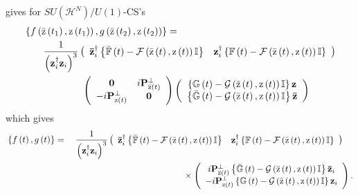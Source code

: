 \documentclass[aps,preprint]{revtex4}%
\begin{document}
gives for $SU\left(  \mathcal{H}^{N}\right)  /U\left(  1\right)  $-CS's%
\begin{align}
&  \left\{  f\left(  \mathrm{\bar{z}}\left(  t_{1}\right)  \mathrm{,z}\left(
t_{1}\right)  \right)  ,g\left(  \mathrm{\bar{z}}\left(  t_{2}\right)
\mathrm{,z}\left(  t_{2}\right)  \right)  \right\}  =\nonumber\\
&  \qquad\frac{1}{\left(  \mathbf{z}_{i}^{\dagger}\mathbf{z}_{i}\right)  ^{3}%
}\left(
\begin{array}
[c]{cc}%
\mathbf{\bar{z}}_{i}^{\dagger}\left\{  \mathbb{\bar{F}}\left(  t\right)
-\mathcal{F}\left(  \mathrm{\bar{z}}\left(  t\right)  \mathrm{,z}\left(
t\right)  \right)  \mathbb{I}\right\}   & \mathbf{z}_{i}^{\dagger}\left\{
\mathbb{F}\left(  t\right)  -\mathcal{F}\left(  \mathrm{\bar{z}}\left(
t\right)  \mathrm{,z}\left(  t\right)  \right)  \mathbb{I}\right\}
\end{array}
\right)  \nonumber\\
&  \qquad\qquad\qquad\left(
\begin{array}
[c]{cc}%
\mathbf{0} & i\mathbf{P}_{\mathrm{\bar{z}}\left(  t\right)  }^{\bot}\\
-i\mathbf{P}_{\mathrm{z}\left(  t\right)  }^{\bot} & \mathbf{0}%
\end{array}
\right)  \left(
\begin{array}
[c]{c}%
\left\{  \mathbb{G}\left(  t\right)  -\mathcal{G}\left(  \mathrm{\bar{z}%
}\left(  t\right)  \mathrm{,z}\left(  t\right)  \right)  \mathbb{I}\right\}
\mathbf{z}\\
\left\{  \mathbb{\bar{G}}\left(  t\right)  -\mathcal{G}\left(  \mathrm{\bar
{z}}\left(  t\right)  \mathrm{,z}\left(  t\right)  \right)  \mathbb{I}%
\right\}  \mathbf{\bar{z}}%
\end{array}
\right)
\end{align}
which gives
\begin{align}
& \left\{  f\left(  t\right)  ,g\left(  t\right)  \right\}  =\quad\frac
{1}{\left(  \mathbf{z}_{i}^{\dagger}\mathbf{z}_{i}\right)  ^{3}}\left(
\begin{array}
[c]{cc}%
\mathbf{\bar{z}}_{i}^{\dagger}\left\{  \mathbb{\bar{F}}\left(  t\right)
-\mathcal{F}\left(  \mathrm{\bar{z}}\left(  t\right)  \mathrm{,z}\left(
t\right)  \right)  \mathbb{I}\right\}   & \mathbf{z}_{i}^{\dagger}\left\{
\mathbb{F}\left(  t\right)  -\mathcal{F}\left(  \mathrm{\bar{z}}\left(
t\right)  \mathrm{,z}\left(  t\right)  \right)  \mathbb{I}\right\}
\end{array}
\right)  \nonumber\\
& \qquad\qquad\qquad\qquad\qquad\qquad\qquad\qquad\qquad\qquad\times\left(
\begin{array}
[c]{c}%
i\mathbf{P}_{\mathrm{\bar{z}}\left(  t\right)  }^{\bot}\left\{  \mathbb{\bar
{G}}\left(  t\right)  -\mathcal{G}\left(  \mathrm{\bar{z}}\left(  t\right)
\mathrm{,z}\left(  t\right)  \right)  \mathbb{I}\right\}  \mathbf{\bar{z}}%
_{i}\\
-i\mathbf{P}_{\mathrm{z}\left(  t\right)  }^{\bot}\left\{  \mathbb{G}\left(
t\right)  -\mathcal{G}\left(  \mathrm{\bar{z}}\left(  t\right)  \mathrm{,z}%
\left(  t\right)  \right)  \mathbb{I}\right\}  \mathbf{z}_{i}%
\end{array}
\right)  .
\end{align}
\end{document}
